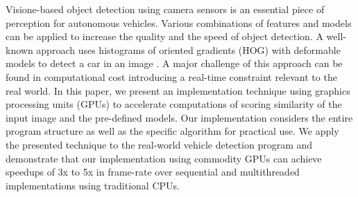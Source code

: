 Visione-based object detection using camera sensors is an essential piece
of perception for autonomous vehicles.
Various combinations of features and models can be applied to increase
the quality and the speed of object detection.
A well-known approach uses histograms of oriented gradients (HOG)
with deformable models to detect a car in an image \cite{Niknejad12}.
A major challenge of this approach can be found in computational cost
introducing a real-time constraint relevant to the real world.
In this paper, we present an implementation technique using graphics
processing units (GPUs) to accelerate computations of scoring similarity
of the input image and the pre-defined models.
Our implementation considers the entire program structure as well as the
specific algorithm for practical use.
We apply the presented technique to the real-world vehicle detection
program and demonstrate that our implementation using commodity
GPUs can achieve speedups of 3x to 5x in frame-rate over sequential
and multithreaded implementations using traditional CPUs.